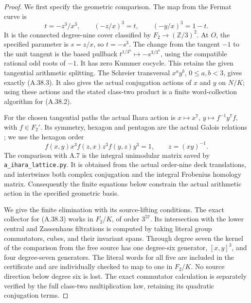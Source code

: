 \begin{proof}
We first specify the geometric comparison. The map from the
Fermat curve is
\[
 t=-z^3/x^3,
 \qquad (-z/x)^3=t,\qquad(-y/x)^3=1-t.
 \tag{A.38.6}
\]
It is the connected degree-nine cover classified by
$F_2\to(\mathbb Z/3)^2$. At $O$, the specified parameter is
$s=z/x$, so $t=-s^3$. The change from the tangent $-1$ to the
unit tangent is the based pullback
$t^{1/3^n}\mapsto-s^{3/3^n}$, using the compatible rational
odd roots of $-1$. It has zero Kummer cocycle. This retains the
given tangential arithmetic splitting. The Schreier transversal
$x^ay^b$, $0\le a,b<3$, gives exactly (A.38.3). It also gives
the actual conjugation actions of $x$ and $y$ on $N/K$; using
these actions and the stated class-two product is a finite
word-collection algorithm for (A.38.2).

For the chosen tangential paths the actual Ihara action is
$x\mapsto x^7$, $y\mapsto f^{-1}y^7f$, with $f\in F_2'$.
Its symmetry, hexagon and
pentagon are the actual Galois relations
\cite[\S\S I.3, I.6]{ASchneps2005}; we use the hexagon order
\[
 f(x,y)x^3 f(z,x)z^3 f(y,z)y^3=1,
 \qquad z=(xy)^{-1}.
 \tag{A.38.7}
\]
The comparison with A.7 is the integral unimodular matrix
saved by \texttt{a\_ihara\_lattice.py}. It is obtained from the
actual order-nine deck translations, and intertwines both
complex conjugation and the integral Frobenius homology matrix.
Consequently the finite equations below constrain the actual
arithmetic action in the specified geometric basis.

We give the finite elimination with its source-lifting
conditions. The exact collector for (A.38.3) works in
$F_2/K$, of order $3^{57}$. Its intersection with the lower
central and Zassenhaus filtrations is computed by taking
literal group commutators, cubes, and their invariant spans.
Through degree seven the kernel of the comparison from the
free source has one degree-six generator, $[x,y]^3$, and four
degree-seven generators. The literal words for all five are
included in the certificate and are individually checked to
map to one in $F_2/K$. No source direction below degree six is
lost. The exact commutator calculation is separately verified
by the full class-two multiplication law, retaining its
quadratic conjugation terms.


\end{proof}
